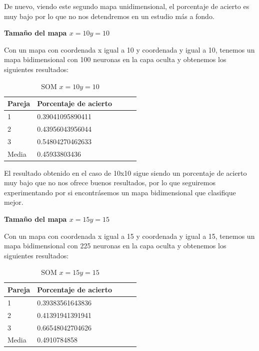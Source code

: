 \documentclass[11pt,spanish,listoffigures,listoftables]{workluis}
\begin{document}
\par De nuevo, viendo este segundo mapa unidimensional, el porcentaje de acierto es muy bajo por lo que no nos detendremos en un estudio más a fondo.


\par \textbf{Tamaño del mapa $x=10 y=10$}

\par Con un mapa con coordenada x igual a 10 y coordenada y igual a 10, tenemos un mapa bidimensional con 100 neuronas en la capa oculta y obtenemos los siguientes resultados:

\begin{table}[H]
\centering
\caption{SOM $x=10 y=10$}
\label{tb:tb33}
\begin{tabular}{lllll}
\hline
\multicolumn{1}{|l|}{Pareja} & Porcentaje de acierto \\ \hline \hline
1                            & 0.39041095890411      \\
2                            & 0.43956043956044      \\
3                            & 0.54804270462633      \\
Media                        & 0.45933803436     	 \\ \hline
\end{tabular}
\end{table}

\par El resultado obtenido en el caso de 10x10 sigue siendo un porcentaje de acierto muy bajo que no nos ofrece buenos resultados, por lo que seguiremos experimentando por si encontrásemos un mapa bidimensional que clasifique mejor.

\par \textbf{Tamaño del mapa $x=15 y=15$}

\par Con un mapa con coordenada x igual a 15 y coordenada y igual a 15, tenemos un mapa bidimensional con 225 neuronas en la capa oculta y obtenemos los siguientes resultados:

\begin{table}[H]
\centering
\caption{SOM $x=15 y=15$}
\label{tb:tb34}
\begin{tabular}{lllll}
\hline
\multicolumn{1}{|l|}{Pareja} & Porcentaje de acierto \\ \hline \hline
1                            & 0.39383561643836      \\
2                            & 0.41391941391941      \\
3                            & 0.66548042704626      \\
Media                        & 0.4910784858     	 \\ \hline
\end{tabular}
\end{table}
\end{document}
